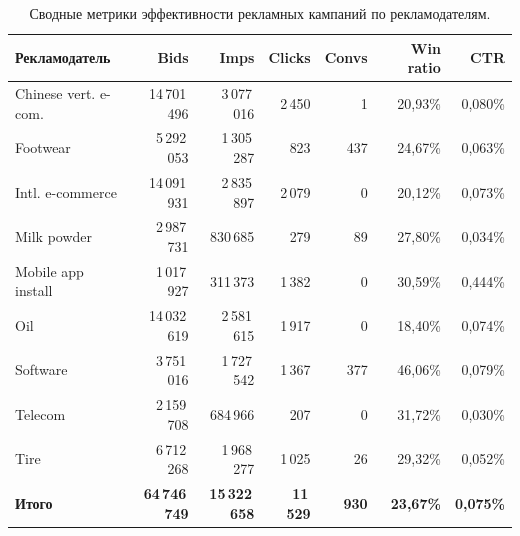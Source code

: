 \begin{table}[h!]
\small
\begin{center}
\caption{Сводные метрики эффективности рекламных кампаний по рекламодателям.}
\label{tab:advertiser_metrics}
\renewcommand{\arraystretch}{1.15}
\begin{tabular}{l|r|r|r|r|r|r}
  \textbf{Рекламодатель} & \textbf{Bids} & \textbf{Imps} & \textbf{Clicks} & \textbf{Convs} & \textbf{Win ratio} & \textbf{CTR} \\
  \hline
  Chinese vert. e-com. & 14\,701\,496 & 3\,077\,016 & 2\,450 & 1    & 20,93\% & 0,080\% \\
  Footwear             &  5\,292\,053 & 1\,305\,287 &   823 & 437  & 24,67\% & 0,063\% \\
  Intl. e-commerce     & 14\,091\,931 & 2\,835\,897 & 2\,079 & 0   & 20,12\% & 0,073\% \\
  Milk powder          &  2\,987\,731 &   830\,685 &   279 &  89  & 27,80\% & 0,034\% \\
  Mobile app install   &  1\,017\,927 &   311\,373 & 1\,382 &  0  & 30,59\% & 0,444\% \\
  Oil                  & 14\,032\,619 & 2\,581\,615 & 1\,917 &  0  & 18,40\% & 0,074\% \\
  Software             &  3\,751\,016 & 1\,727\,542 & 1\,367 & 377 & 46,06\% & 0,079\% \\
  Telecom              &  2\,159\,708 &   684\,966 &   207 &  0   & 31,72\% & 0,030\% \\
  Tire                 &  6\,712\,268 & 1\,968\,277 & 1\,025 & 26  & 29,32\% & 0,052\% \\
  \hline
  \textbf{Итого}       & \textbf{64\,746\,749} & \textbf{15\,322\,658} & \textbf{11\,529} & \textbf{930} & \textbf{23,67\%} & \textbf{0,075\%} \\
\end{tabular}
\end{center}
\end{table}

